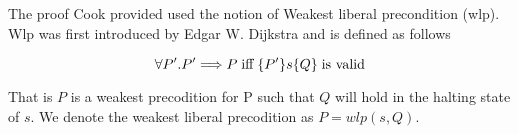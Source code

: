 The proof Cook provided used the notion of Weakest liberal precondition (wlp). Wlp was first introduced by Edgar W. Dijkstra and is defined as follows

$$
\forall P'. P' \Longrightarrow P \; \text{iff} \; \{P'\}s\{Q\} \; \text{is valid}
$$

That is $P$ is a weakest precodition for P such that $Q$ will hold in the halting state of $s$. We denote
the weakest liberal precodition as $P = wlp(s,Q)$.
